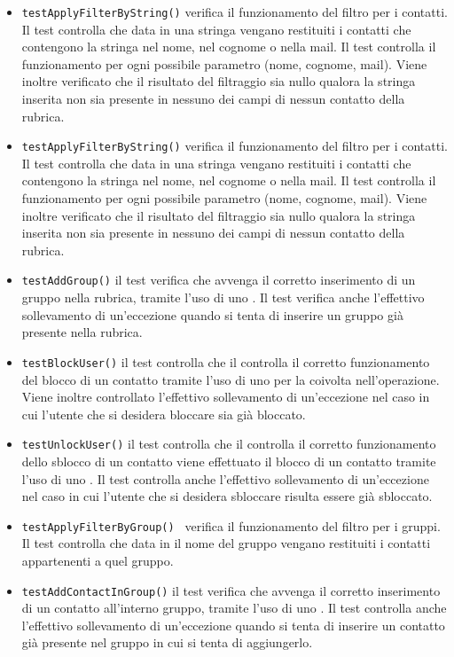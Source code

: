 \begin{itemize}
\item \texttt{testApplyFilterByString()} verifica il funzionamento del filtro per i contatti. Il test controlla che data in  una stringa vengano restituiti i contatti che contengono la stringa nel nome, nel cognome o nella mail. Il test controlla il funzionamento per ogni possibile parametro (nome, cognome, mail). Viene inoltre verificato che il risultato del filtraggio sia nullo qualora la stringa inserita non sia presente in nessuno dei campi di nessun contatto della rubrica.
\item \texttt{testApplyFilterByString()} verifica il funzionamento del filtro per i contatti. Il test controlla che data in  una stringa vengano restituiti i contatti che contengono la stringa nel nome, nel cognome o nella mail. Il test controlla il funzionamento per ogni possibile parametro (nome, cognome, mail). Viene inoltre verificato che il risultato del filtraggio sia nullo qualora la stringa inserita non sia presente in nessuno dei campi di nessun contatto della rubrica.
\item \texttt{testAddGroup()} il test verifica che avvenga il corretto inserimento di un gruppo nella rubrica, tramite l'uso di uno . Il test verifica anche l'effettivo sollevamento di un'eccezione quando si tenta di inserire un gruppo già presente nella rubrica.
\item \texttt{testBlockUser()} il test controlla che il controlla il corretto funzionamento del blocco di un contatto tramite l'uso di uno  per la  coivolta nell'operazione. Viene inoltre controllato l'effettivo sollevamento di un'eccezione nel caso in cui l'utente che si desidera bloccare sia già bloccato.
\item \texttt{testUnlockUser()} il test controlla che il controlla il corretto funzionamento dello sblocco di un contatto viene effettuato il blocco di un contatto tramite l'uso di uno . Il test controlla anche l'effettivo sollevamento di un'eccezione nel caso in cui l'utente che si desidera sbloccare risulta essere già sbloccato.
\item \texttt{testApplyFilterByGroup() } verifica il funzionamento del filtro per i gruppi. Il test controlla che data in  il nome del gruppo vengano restituiti i contatti appartenenti a quel gruppo. 
\item \texttt{testAddContactInGroup()} il test verifica che avvenga il corretto inserimento di un contatto all'interno gruppo, tramite l'uso di uno . Il test controlla anche l'effettivo sollevamento di un'eccezione quando si tenta di inserire un contatto già presente nel gruppo in cui si tenta di aggiungerlo.

\end{itemize}
